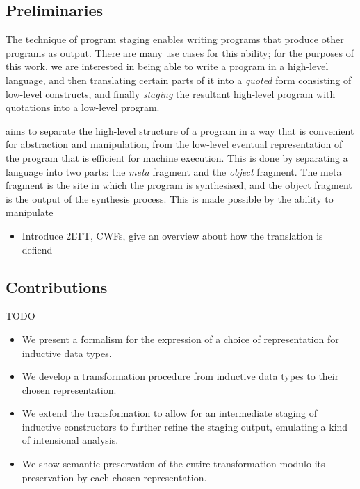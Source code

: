 
\subsection{Preliminaries}

The technique of program staging enables writing programs that produce other
programs as output. There are many use cases for this ability; for the purposes
of this work, we are interested in being able to write a program in a
high-level language, and then translating certain parts of it into a
\emph{quoted} form consisting of low-level constructs, and finally
\emph{staging} the resultant high-level program with quotations into a
low-level program.

aims to separate the high-level structure of a program in a way that is
convenient for abstraction and manipulation, from the low-level eventual
representation of the program that is efficient for machine execution. This is
done by separating a language into two parts: the \emph{meta} fragment and the
\emph{object} fragment. The meta fragment is the site in which the program is
synthesised, and the object fragment is the output of the synthesis process.
This is made possible by the ability to manipulate 

\begin{itemize}
  \item Introduce 2LTT, CWFs, give an overview about how the translation is defiend
\end{itemize}

\subsection{Contributions}

TODO

\begin{itemize}
  \item We present a formalism for the expression of a choice of representation for
        inductive data types. 
  \item We develop a transformation procedure from inductive data types to their chosen
        representation.
  \item We extend the transformation to allow for an intermediate staging of inductive
        constructors to further refine the staging output, emulating a kind of
        intensional analysis. 
  \item We show semantic preservation of the entire transformation modulo its
        preservation by each chosen representation. 
\end{itemize}

